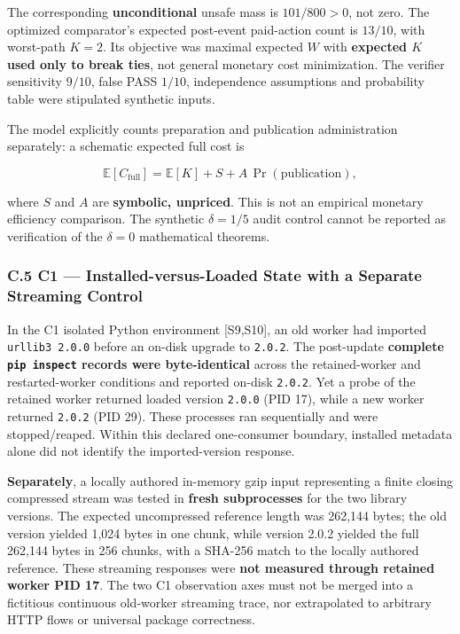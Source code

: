 \documentclass[
  10pt,
  american,
  a4paper,
]{article}
\begin{document}
The corresponding \textbf{unconditional} unsafe mass is \(101/800>0\),
not zero. The optimized comparator's expected post-event paid-action
count is \(13/10\), with worst-path \(K=2\). Its objective was maximal
expected \(W\) with \textbf{expected \(K\) used only to break ties}, not
general monetary cost minimization. The verifier sensitivity \(9/10\),
false PASS \(1/10\), independence assumptions and probability table were
stipulated synthetic inputs.

The model explicitly counts preparation and publication administration
separately: a schematic expected full cost is

\[
\mathbb E[C_{\mathrm{full}}]
 =\mathbb E[K]+S+A\,\Pr(\mathrm{publication}),
\]

where \(S\) and \(A\) are \textbf{symbolic, unpriced}. This is not an
empirical monetary efficiency comparison. The synthetic \(\delta=1/5\)
audit control cannot be reported as verification of the \(\delta=0\)
mathematical theorems.

\hypertarget{c.5-c1-installed-versus-loaded-state-with-a-separate-streaming-control}{%
\subsubsection{C.5 C1 --- Installed-versus-Loaded State with a Separate
Streaming
Control}\label{c.5-c1-installed-versus-loaded-state-with-a-separate-streaming-control}}

In the C1 isolated Python environment {[}S9,S10{]}, an old worker had
imported \texttt{urllib3\ 2.0.0} before an on-disk upgrade to
\texttt{2.0.2}. The post-update \textbf{complete \texttt{pip\ inspect}
records were byte-identical} across the retained-worker and
restarted-worker conditions and reported on-disk \texttt{2.0.2}. Yet a
probe of the retained worker returned loaded version \texttt{2.0.0} (PID
17), while a new worker returned \texttt{2.0.2} (PID 29). These
processes ran sequentially and were stopped/reaped. Within this declared
one-consumer boundary, installed metadata alone did not identify the
imported-version response.

\textbf{Separately}, a locally authored in-memory gzip input
representing a finite closing compressed stream was tested in
\textbf{fresh subprocesses} for the two library versions. The expected
uncompressed reference length was 262,144 bytes; the old version yielded
1,024 bytes in one chunk, while version 2.0.2 yielded the full 262,144
bytes in 256 chunks, with a SHA-256 match to the locally authored
reference. These streaming responses were \textbf{not measured through
retained worker PID 17}. The two C1 observation axes must not be merged
into a fictitious continuous old-worker streaming trace, nor
extrapolated to arbitrary HTTP flows or universal package correctness.
\end{document}
